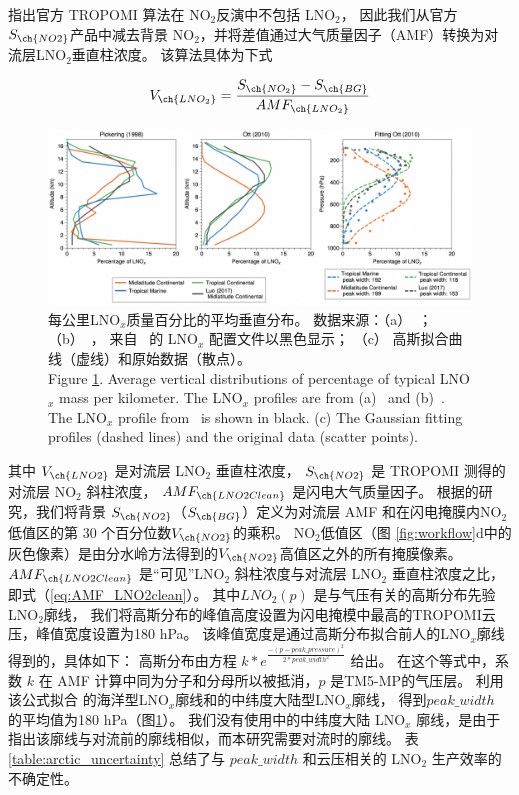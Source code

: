 \citet{Zhang.2022a}指出官方 TROPOMI 算法在 NO$_2$反演中不包括 LNO$_2$，
因此我们从官方 $S_{\ch{NO2}}$产品中减去背景 NO$_2$，并将差值通过大气质量因子（AMF）转换为对流层LNO$_2$垂直柱浓度。
该算法具体为下式


\begin{equation} \label{eq:arctic_LNO2}
V_{\ch{LNO_2}} = \frac{S_{\ch{NO_2}} - S_{\ch{BG}}}{AMF_{\ch{LNO_2}}}
\end{equation}

\begin{figure}[!htbp]
\centering
\includegraphics[width=16cm]{./figures/arctic_lnox_profile.png}
\caption{
每公里LNO$_x$质量百分比的平均垂直分布。
数据来源：（a）\  \citet{Pickering.1998}；（b）\  \citet{Ott.2010}，
来自\  \citet{Luo.2017} 的 LNO$_x$ 配置文件以黑色显示；
（c） 高斯拟合曲线（虚线）和原始数据（散点）。\\
Figure \ref{fig:arctic_lnox_profile}.
Average vertical distributions of percentage of typical LNO$_x$ mass per kilometer.
The LNO$_x$ profiles are from (a)\  \citet{Pickering.1998} and (b)\  \citet{Ott.2010}.
The LNO$_x$ profile from\  \citet{Luo.2017} is shown in black.
(c)  The Gaussian fitting profiles (dashed lines) and the original data (scatter points).
}
\label{fig:arctic_lnox_profile}
\end{figure}

其中 $V_{\ch{LNO2}}$ 是对流层 LNO$_2$ 垂直柱浓度，
$S_{\ch{NO2}}$ 是 TROPOMI 测得的对流层 NO$_2$ 斜柱浓度，
$AMF_{\ch{LNO2Clean}}$ 是闪电大气质量因子。
根据\citet{Allen.2021a}的研究，我们将背景 $S_{\ch{NO2}}$（$S_{\ch{BG}}$）定义为对流层 AMF 和在闪电掩膜内NO$_2$低值区的第 30 个百分位数$V_{\ch{NO2}}$的乘积。
NO$_2$低值区（图 \ref{fig:workflow}d中的灰色像素）是由分水岭方法得到的$V_{\ch{NO2}}$高值区之外的所有掩膜像素。
$AMF_{\ch{LNO2Clean}}$ 是“可见”LNO$_2$ 斜柱浓度与对流层 LNO$_2$ 垂直柱浓度之比，即式（\ref{eq:AMF_LNO2clean}）。
其中$LNO_2(p)$ 是与气压有关的高斯分布先验 LNO$_2$廓线，
我们将高斯分布的峰值高度设置为闪电掩模中最高的TROPOMI云压，峰值宽度设置为180 hPa。
该峰值宽度是通过高斯分布拟合前人的LNO$_x$廓线得到的，具体如下：
高斯分布由方程 $k*e^\frac{{-{(p - peak\_pressure)}^2}}{2*peak\_width^{2}}$ 给出。
在这个等式中，系数 $k$ 在 AMF 计算中同为分子和分母所以被抵消，$p$ 是TM5-MP的气压层。
利用该公式拟合 \citet{Ott.2010} 的海洋型LNO$_x$廓线和\citet{Luo.2017}的中纬度大陆型LNO$_x$廓线，
得到$peak\_width$ 的平均值为180 hPa（图\ref{fig:arctic_lnox_profile}）。
我们没有使用\citet{Ott.2010}中的中纬度大陆 LNO$_x$ 廓线，是由于\citet{Luo.2017}指出该廓线与对流前的廓线相似，而本研究需要对流时的廓线。
表 \ref{table:arctic_uncertainty} 总结了与 $peak\_width$ 和云压相关的 LNO$_2$ 生产效率的不确定性。


